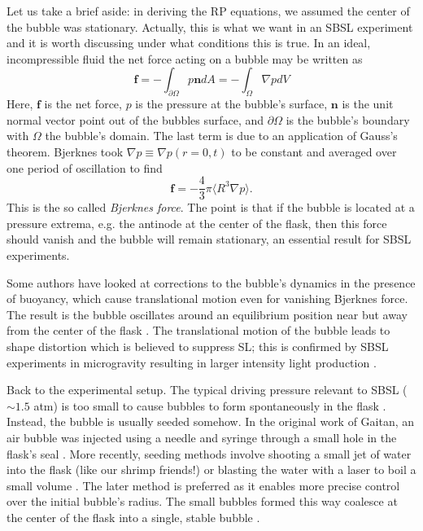 \documentclass[prb,aps,nofootinbib,superscriptaddress,floatfix]{revtex4-2}
\begin{document}
Let us take a brief aside: in deriving the RP equations, we assumed the center of the bubble was stationary. Actually, this is what we want in an SBSL experiment and it is worth discussing under what conditions this is true. In an ideal, incompressible fluid the net force acting on a bubble may be written as 
\begin{equation}
    \bm{f}=-\int_{\partial \Omega} p \bm{n} dA = -\int_\Omega \nabla p dV
\end{equation}
Here, $\bm{f}$ is the net force, $p$ is the pressure at the bubble's surface, $\bm{n}$ is the unit normal vector point out of the bubbles surface, and $\partial \Omega$ is the bubble's boundary with $\Omega$ the bubble's domain. The last term is due to an application of Gauss's theorem. Bjerknes \cite{bjerknes1909kraftfelder} took $\nabla p \equiv \nabla p(r=0,t)$ to be constant and averaged over one period of oscillation to find 
\begin{equation}
    \bm{f} = -\frac{4}{3}\pi \langle R^3 \nabla p \rangle.
    \label{eq:Bj_force}
\end{equation}
This is the so called \emph{Bjerknes force}. The point is that if the bubble is located at a pressure extrema, e.g. the antinode at the center of the flask, then this force should vanish and the bubble will remain stationary, an essential result for SBSL experiments.

Some authors have looked at corrections to the bubble's dynamics in the presence of buoyancy, which cause translational motion even for vanishing Bjerknes force. The result is the bubble oscillates around an equilibrium position near but away from the center of the flask \cite{matula2000single,matula1997bjerknes,matula1999inertial}. The translational motion of the bubble leads to shape distortion which is believed to suppress SL; this is confirmed by SBSL experiments in microgravity resulting in larger intensity light production \cite{matula2000single}.

Back to the experimental setup. The typical driving pressure relevant to SBSL ($\sim 1.5$ atm) is too small to cause bubbles to form spontaneously in the flask \cite{}. Instead, the bubble is usually seeded somehow. In the original work of Gaitan, an air bubble was injected using a needle and syringe through a small hole in the flask's seal \cite{gaitan1992sonoluminescence}. More recently, seeding methods involve shooting a small jet of water into the flask (like our shrimp friends!) or blasting the water with a laser to boil a small volume \cite{}. The later method is preferred as it enables more precise control over the initial bubble's radius. The small bubbles formed this way coalesce at the center of the flask into a single, stable bubble \cite{}.
\end{document}
